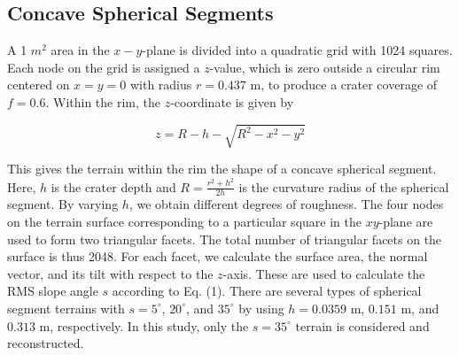 \documentclass{optica-article}
\begin{document}
\subsection{Concave Spherical Segments}\label{sec:concave}

 A 1 $m^2$ area in the $x-y$-plane is divided into a quadratic grid with 
1024 squares. Each node on the grid is assigned a $z$-value, 
which is zero outside a circular rim centered on $x = y = 0$ with 
radius $r = 0.437$ m, to produce a crater coverage of $f = 0.6$. 
Within the rim, the $z$-coordinate is given by 

\begin{equation}
z = R - h - \sqrt{R^2 - x^2 - y^2}
\end{equation}

This gives the terrain within the rim the shape of a concave spherical 
segment. Here, $h$ is the crater depth and $R = \frac{r^2 + h^2}{2h}$ is 
the curvature radius of the spherical segment. By varying $h$, we obtain 
different degrees of roughness.
The four nodes on the terrain surface corresponding to a particular square 
in the $xy$-plane are used to form two triangular facets. The total number
 of triangular facets on the surface is thus 2048. For each facet, 
 we calculate the surface area, the normal vector, and its tilt with respect to the $z$-axis.
 These are used to calculate the RMS slope angle $s$ according to Eq. (1).
There are several types of spherical segment terrains with $s = 5^\circ$, $20^\circ$, and 
$35^\circ$ by using $h = 0.0359$ m, $0.151$ m, and $0.313$ m, respectively. In this study,
only the $s = 35^\circ$ terrain is considered and reconstructed.
\end{document}
